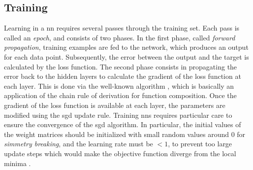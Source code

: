 \subsection{Training}\label{sec:training}
Learning in a \gls{nn} requires several passes through the training set. Each pass is called an \emph{epoch}, and consists of two phases. In the first phase, called \emph{forward propagation}, training examples are fed to the network, which produces an output for each data point. Subsequently, the error between the output and the target is calculated by the loss function. The second phase consists in propagating the error back to the hidden layers to calculate the gradient of the loss function at each layer. This is done via the well-known  algorithm \citep{rumelhart1986backprop}, which is basically an application of the chain rule of derivation for function composition. Once the gradient of the loss function is available at each layer, the parameters are modified using the \gls{sgd} update rule. Training \glspl{nn} requires particular care to ensure the convergence of the \gls{sgd} algorithm. In particular, the initial values of the weight matrices should be initialized with small random values around 0 for \emph{simmetry breaking}, and the learning rate must be $< 1$, to prevent too large update steps which would make the objective function diverge from the local minima \citep{lecun1998backprop}.

